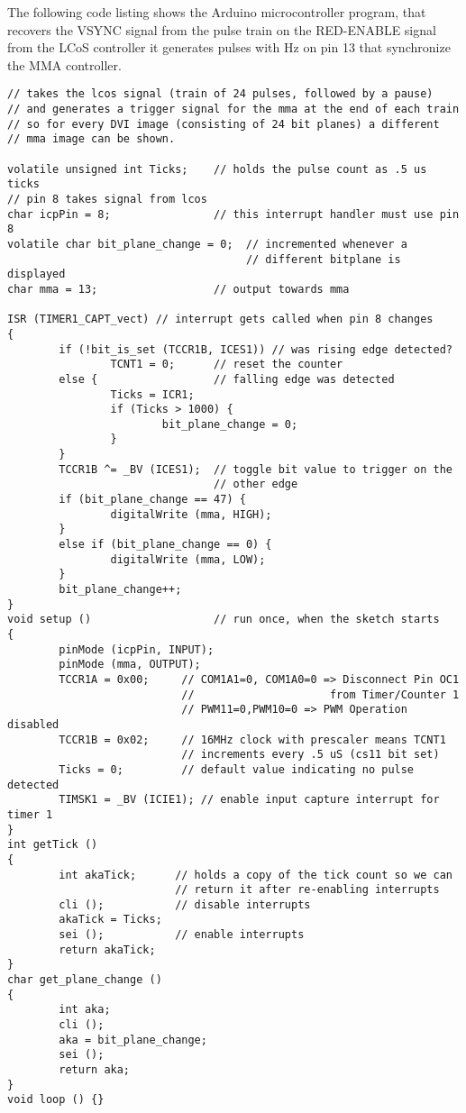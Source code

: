 The following code listing shows the Arduino microcontroller program,
that recovers the \textsf{VSYNC} signal from the pulse train on the
\textsf{RED-ENABLE} signal from the LCoS controller it generates
pulses with \unit[60]{Hz} on pin 13 that synchronize the MMA
controller.  {\small\label{fig:arduino-vsync}
\begin{verbatim}
// takes the lcos signal (train of 24 pulses, followed by a pause)
// and generates a trigger signal for the mma at the end of each train
// so for every DVI image (consisting of 24 bit planes) a different
// mma image can be shown. 

volatile unsigned int Ticks;    // holds the pulse count as .5 us ticks
// pin 8 takes signal from lcos
char icpPin = 8;                // this interrupt handler must use pin 8
volatile char bit_plane_change = 0;  // incremented whenever a 
                                     // different bitplane is displayed
char mma = 13;                  // output towards mma

ISR (TIMER1_CAPT_vect) // interrupt gets called when pin 8 changes
{
        if (!bit_is_set (TCCR1B, ICES1)) // was rising edge detected?
                TCNT1 = 0;      // reset the counter
        else {                  // falling edge was detected
                Ticks = ICR1;
                if (Ticks > 1000) {
                        bit_plane_change = 0;
                }
        }
        TCCR1B ^= _BV (ICES1);  // toggle bit value to trigger on the
                                // other edge
        if (bit_plane_change == 47) {
                digitalWrite (mma, HIGH);
        }
        else if (bit_plane_change == 0) {
                digitalWrite (mma, LOW);
        }
        bit_plane_change++;
}
void setup ()                   // run once, when the sketch starts
{
        pinMode (icpPin, INPUT);
        pinMode (mma, OUTPUT);
        TCCR1A = 0x00;     // COM1A1=0, COM1A0=0 => Disconnect Pin OC1
                           //                     from Timer/Counter 1
                           // PWM11=0,PWM10=0 => PWM Operation disabled
        TCCR1B = 0x02;     // 16MHz clock with prescaler means TCNT1
                           // increments every .5 uS (cs11 bit set)
        Ticks = 0;         // default value indicating no pulse detected
        TIMSK1 = _BV (ICIE1); // enable input capture interrupt for timer 1
}
int getTick ()
{
        int akaTick;      // holds a copy of the tick count so we can
                          // return it after re-enabling interrupts
        cli ();           // disable interrupts
        akaTick = Ticks;
        sei ();           // enable interrupts
        return akaTick;
}
char get_plane_change ()
{
        int aka;
        cli ();
        aka = bit_plane_change;
        sei ();
        return aka;
}
void loop () {}                 
\end{verbatim}
}

